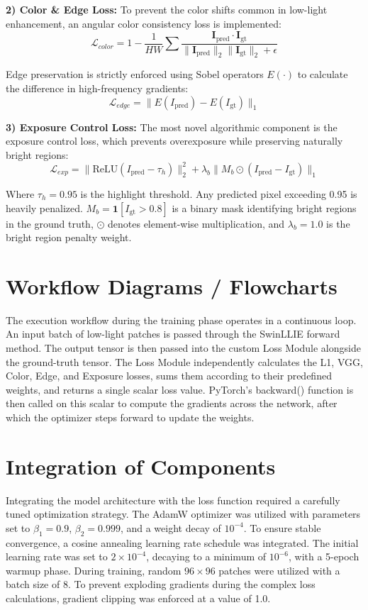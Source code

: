 \documentclass[12pt, a4paper]{report}
\begin{document}
\textbf{2) Color \& Edge Loss:} To prevent the color shifts common in low-light enhancement, an angular color consistency loss is implemented:
\begin{equation}
\mathcal{L}_{color} = 1 - \frac{1}{HW}\sum \frac{\mathbf{I}_{\text{pred}} \cdot \mathbf{I}_{\text{gt}}}{\|\mathbf{I}_{\text{pred}}\|_2 \|\mathbf{I}_{\text{gt}}\|_2 + \epsilon}
\end{equation}

Edge preservation is strictly enforced using Sobel operators $E(\cdot)$ to calculate the difference in high-frequency gradients:
\begin{equation}
\mathcal{L}_{edge} = \|E(I_{\text{pred}}) - E(I_{\text{gt}})\|_1
\end{equation}

\textbf{3) Exposure Control Loss:} The most novel algorithmic component is the exposure control loss, which prevents overexposure while preserving naturally bright regions:
\begin{equation}
\mathcal{L}_{exp} = \|\text{ReLU}(I_{\text{pred}} - \tau_h)\|_2^2 + \lambda_b \|M_b \odot (I_{\text{pred}} - I_{\text{gt}})\|_1
\end{equation}

Where $\tau_h = 0.95$ is the highlight threshold. Any predicted pixel exceeding 0.95 is heavily penalized. $M_b = \mathbf{1}[I_{\text{gt}} > 0.8]$ is a binary mask identifying bright regions in the ground truth, $\odot$ denotes element-wise multiplication, and $\lambda_b = 1.0$ is the bright region penalty weight.

\section{Workflow Diagrams / Flowcharts}
The execution workflow during the training phase operates in a continuous loop. An input batch of low-light patches is passed through the SwinLLIE forward method. The output tensor is then passed into the custom Loss Module alongside the ground-truth tensor. The Loss Module independently calculates the L1, VGG, Color, Edge, and Exposure losses, sums them according to their predefined weights, and returns a single scalar loss value. PyTorch's backward() function is then called on this scalar to compute the gradients across the network, after which the optimizer steps forward to update the weights.

\section{Integration of Components}
Integrating the model architecture with the loss function required a carefully tuned optimization strategy. The AdamW optimizer was utilized with parameters set to $\beta_1 = 0.9$, $\beta_2 = 0.999$, and a weight decay of $10^{-4}$. To ensure stable convergence, a cosine annealing learning rate schedule was integrated. The initial learning rate was set to $2 \times 10^{-4}$, decaying to a minimum of $10^{-6}$, with a 5-epoch warmup phase. During training, random $96 \times 96$ patches were utilized with a batch size of 8. To prevent exploding gradients during the complex loss calculations, gradient clipping was enforced at a value of 1.0.
\end{document}
